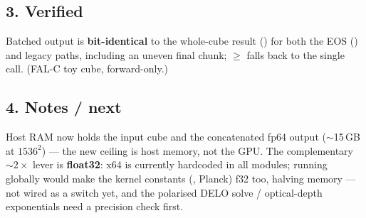 \subsection*{3. Verified}
Batched output is \textbf{bit-identical} to the whole-cube result () for both the
EOS () and legacy  paths, including an uneven final chunk; $\ge$
falls back to the single call. (FAL-C toy cube, forward-only.)

\subsection*{4. Notes / next}
Host RAM now holds the input cube and the concatenated fp64 output ($\sim$15\,GB at $1536^2$) --- the new
ceiling is host memory, not the GPU. The complementary $\sim2\times$ lever is \textbf{float32}: x64 is
currently hardcoded  in all modules; running  globally would make
the kernel constants (, Planck) f32 too, halving memory --- not wired as a switch yet, and
the polarised DELO solve / optical-depth exponentials need a precision check first.


